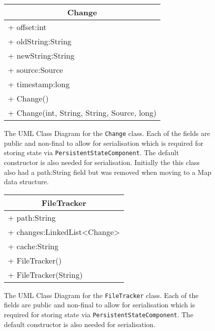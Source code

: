 \begin{figure}[H]
\centering
\begin{tabular}{|l|}
\hline
\multicolumn{1}{|c|}{\textbf{Change}}\\ \hline
+ offset:int\\
+ oldString:String\\
+ newString:String\\
+ source:Source\\
+ timestamp:long\\ \hline
+ Change()\\
+ Change(int, String, String, Source, long)\\ \hline
\end{tabular}
\caption[Change UML Class Diagram]{The UML Class Diagram for the \texttt{Change} class. Each of the fields are public and non-final to allow for serialisation which is required for storing state via \texttt{PersistentStateComponent}. The default constructor is also needed for serialisation. Initially the this class also had a path:String field but was removed when moving to a Map data structure.}
\label{fig:uml-class-change}
\end{figure}

\begin{figure}[H]
\centering
\begin{tabular}{|l|}
\hline
\multicolumn{1}{|c|}{\textbf{FileTracker}}\\ \hline
+ path:String\\
+ changes:LinkedList\textless{}Change\textgreater{}\\
+ cache:String\\ \hline
+ FileTracker()\\
+ FileTracker(String)\\ \hline
\end{tabular}
\caption[FileTracker UML Class Diagram]{The UML Class Diagram for the \texttt{FileTracker} class. Each of the fields are public and non-final to allow for serialisation which is required for storing state via \texttt{PersistentStateComponent}. The default constructor is also needed for serialisation.}
\label{fig:uml-class-filetracker}
\end{figure}

